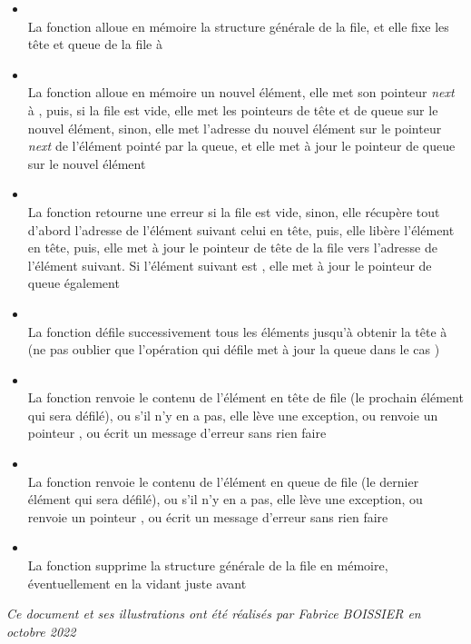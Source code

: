 \documentclass[11pt,a4paper]{article}
\begin{document}
\begin{itemize}
\item {}\\
      La fonction alloue en mémoire la structure générale de la file, et elle fixe les tête et queue de la file à 
\item {}\\
      La fonction alloue en mémoire un nouvel élément, elle met son pointeur \textit{next} à , puis, si la file est vide, elle met les pointeurs de tête et de queue sur le nouvel élément, sinon, elle met l'adresse du nouvel élément sur le pointeur \textit{next} de l'élément pointé par la queue, et elle met à jour le pointeur de queue sur le nouvel élément
\item {}\\
      La fonction retourne une erreur si la file est vide, sinon, elle récupère tout d'abord l'adresse de l'élément suivant celui en tête, puis, elle libère l'élément en tête, puis, elle met à jour le pointeur de tête de la file vers l'adresse de l'élément suivant. Si l'élément suivant est , elle met à jour le pointeur de queue également
\item {}\\
      La fonction défile successivement tous les éléments jusqu'à obtenir la tête à  (ne pas oublier que l'opération qui défile met à jour la queue dans le cas )
\item {}\\
      La fonction renvoie le contenu de l'élément en tête de file (le prochain élément qui sera défilé), ou s'il n'y en a pas, elle lève une exception, ou renvoie un pointeur , ou écrit un message d'erreur sans rien faire
\item {}\\
      La fonction renvoie le contenu de l'élément en queue de file (le dernier élément qui sera défilé), ou s'il n'y en a pas, elle lève une exception, ou renvoie un pointeur , ou écrit un message d'erreur sans rien faire
\item {}\\
      La fonction supprime la structure générale de la file en mémoire, éventuellement en la vidant juste avant
\end{itemize}

\bigskip

\vfillFirst

\vfillLast


\begin{center}
\textit{Ce document et ses illustrations ont été réalisés par Fabrice BOISSIER en octobre 2022}
\end{center}
\end{document}
